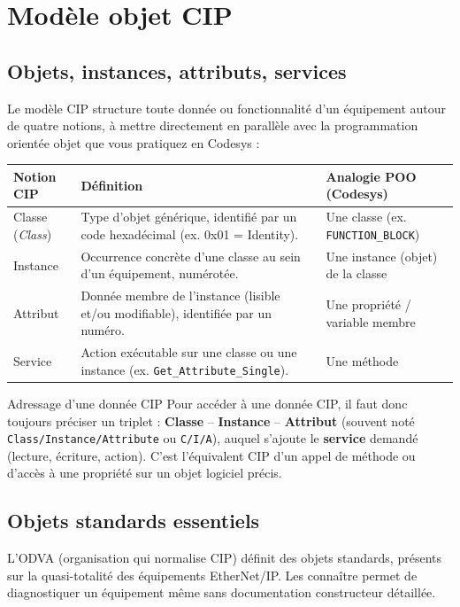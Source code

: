 \section{Modèle objet CIP}
\label{sec:modele_cip}

\subsection{Objets, instances, attributs, services}
Le modèle CIP structure toute donnée ou fonctionnalité d'un équipement autour de quatre notions, à mettre directement en parallèle avec la programmation orientée objet que vous pratiquez en Codesys :

\begin{center}
    \begin{tabular}{|p{3cm}|p{6.5cm}|p{4.5cm}|}
        \hline
        \textbf{Notion CIP} & \textbf{Définition} & \textbf{Analogie POO (Codesys)} \\
        \hline
        Classe (\emph{Class}) & Type d'objet générique, identifié par un code hexadécimal (ex. 0x01 = Identity). & Une classe (ex. \texttt{FUNCTION\_BLOCK}) \\
        \hline
        Instance & Occurrence concrète d'une classe au sein d'un équipement, numérotée. & Une instance (objet) de la classe \\
        \hline
        Attribut & Donnée membre de l'instance (lisible et/ou modifiable), identifiée par un numéro. & Une propriété / variable membre \\
        \hline
        Service & Action exécutable sur une classe ou une instance (ex. \texttt{Get\_Attribute\_Single}). & Une méthode \\
        \hline
    \end{tabular}
\end{center}

\begin{UPSTIinfor}{Adressage d'une donnée CIP}
    Pour accéder à une donnée CIP, il faut donc toujours préciser un triplet : \textbf{Classe} -- \textbf{Instance} -- \textbf{Attribut} (souvent noté \texttt{Class/Instance/Attribute} ou \texttt{C/I/A}), auquel s'ajoute le \textbf{service} demandé (lecture, écriture, action). C'est l'équivalent CIP d'un appel de méthode ou d'accès à une propriété sur un objet logiciel précis.
\end{UPSTIinfor}

\subsection{Objets standards essentiels}
L'ODVA (organisation qui normalise CIP) définit des objets standards, présents sur la quasi-totalité des équipements EtherNet/IP. Les connaître permet de diagnostiquer un équipement même sans documentation constructeur détaillée.

